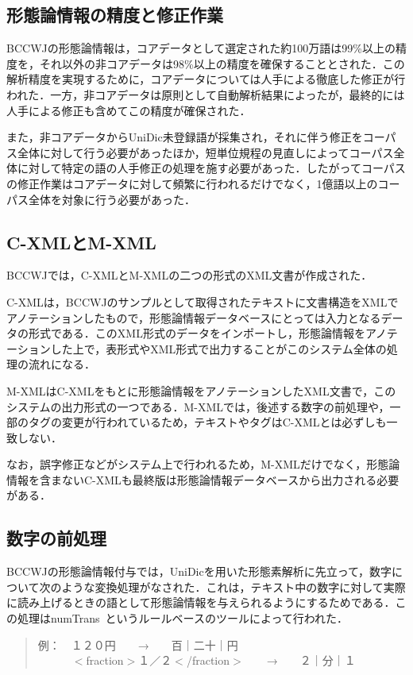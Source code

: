 \documentclass[japanese]{jnlp_1.4}
\begin{document}
\subsection{形態論情報の精度と修正作業}
\label{sec:knowledge_accuracy}

BCCWJの形態論情報は，コアデータとして選定された約100万語は99\%以上の精度を，それ以外の非コアデータは98\%以上の精度を確保することとされた．この解析精度を実現するために，コアデータについては人手による徹底した修正が行われた．一方，非コアデータは原則として自動解析結果によったが，最終的には人手による修正も含めてこの精度が確保された\cite{国立国語研究所コーパス開発センター2011}．

また，非コアデータからUniDic未登録語が採集され，それに伴う修正をコーパス全体に対して行う必要があったほか，短単位規程の見直しによってコーパス全体に対して特定の語の人手修正の処理を施す必要があった．したがってコーパスの修正作業はコアデータに対して頻繁に行われるだけでなく，1億語以上のコーパス全体を対象に行う必要があった．


\subsection{C-XMLとM-XML}
\label{sec:knowledge_xml}

BCCWJでは，C-XMLとM-XMLの二つの形式のXML文書が作成された\cite{国立国語研究所コーパス開発センター2011}．

C-XMLは，BCCWJのサンプルとして取得されたテキストに文書構造をXMLでアノテーションしたもので，形態論情報データベースにとっては入力となるデータの形式である．このXML形式のデータをインポートし，形態論情報をアノテーションした上で，表形式やXML形式で出力することがこのシステム全体の処理の流れになる．

M-XMLはC-XMLをもとに形態論情報をアノテーションしたXML文書で，このシステムの出力形式の一つである．M-XMLでは，後述する数字の前処理や，一部のタグの変更が行われているため，テキストやタグはC-XMLとは必ずしも一致しない．

なお，誤字修正などがシステム上で行われるため，M-XMLだけでなく，形態論情報を含まないC-XMLも最終版は形態論情報データベースから出力される必要がある．


\subsection{数字の前処理}
\label{sec:knowledge_numtrans}

BCCWJの形態論情報付与では，UniDicを用いた形態素解析に先立って，数字について次のような変換処理がなされた．これは，テキスト中の数字に対して実際に読み上げるときの語として形態論情報を与えられるようにするためである．この処理はnumTrans~\cite{Numtrans}というルールベースのツールによって行われた．
\begin{quote}
例：　１２０円　　→　　百｜二十｜円\\
　　　$<$fraction$>$１／２$<$/fraction$>$　　→　　２｜分｜１
\end{quote}
\end{document}
